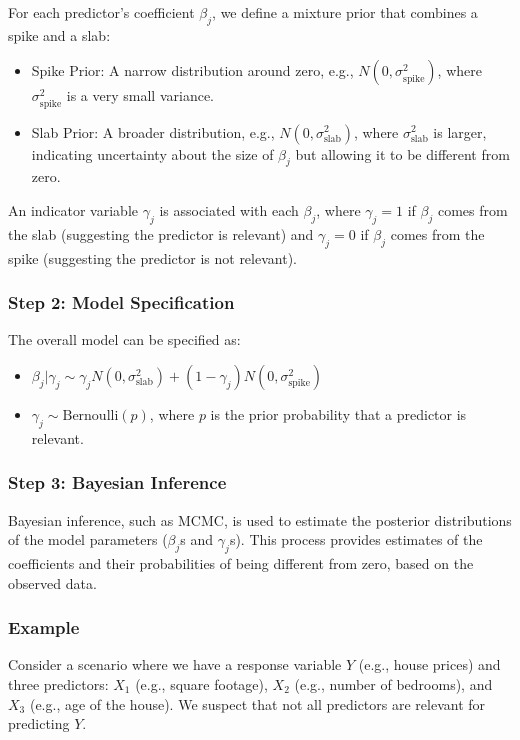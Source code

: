 \documentclass{article}
\begin{document}
For each predictor's coefficient \( \beta_j \), we define a mixture prior that combines a spike and a slab:
\begin{itemize}
    \item Spike Prior: A narrow distribution around zero, e.g., \(N(0, \sigma_{\text{spike}}^2)\), where \(\sigma_{\text{spike}}^2\) is a very small variance.
    \item Slab Prior: A broader distribution, e.g., \(N(0, \sigma_{\text{slab}}^2)\), where \(\sigma_{\text{slab}}^2\) is larger, indicating uncertainty about the size of \( \beta_j \) but allowing it to be different from zero.
\end{itemize}

An indicator variable \( \gamma_j \) is associated with each \( \beta_j \), where \( \gamma_j = 1 \) if \( \beta_j \) comes from the slab (suggesting the predictor is relevant) and \( \gamma_j = 0 \) if \( \beta_j \) comes from the spike (suggesting the predictor is not relevant).

\subsubsection{Step 2: Model Specification}

The overall model can be specified as:
\begin{itemize}
    \item \( \beta_j | \gamma_j \sim \gamma_j N(0, \sigma_{\text{slab}}^2) + (1 - \gamma_j) N(0, \sigma_{\text{spike}}^2) \)
    \item  \( \gamma_j \sim \text{Bernoulli}(p) \), where \(p\) is the prior probability that a predictor is relevant.
\end{itemize}

\subsubsection{Step 3: Bayesian Inference}
Bayesian inference, such as MCMC, is used to estimate the posterior distributions of the model parameters (\( \beta_j \)s and \( \gamma_j \)s). This process provides estimates of the coefficients and their probabilities of being different from zero, based on the observed data.

\subsubsection{Example}

Consider a scenario where we have a response variable \(Y\) (e.g., house prices) and three predictors: \(X_1\) (e.g., square footage), \(X_2\) (e.g., number of bedrooms), and \(X_3\) (e.g., age of the house). We suspect that not all predictors are relevant for predicting \(Y\).
\end{document}
